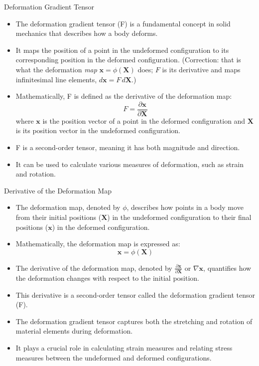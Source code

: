 \documentclass{beamer}
\begin{document}
\begin{frame}{Deformation Gradient Tensor}
    \begin{itemize}
        \item The deformation gradient tensor (F) is a fundamental concept in solid mechanics that describes how a body deforms.
        \item It maps the position of a point in the undeformed configuration to its corresponding position in the deformed configuration. (Correction: that is what the deformation \emph{map} $\mathbf{x}=\phi(\mathbf{X})$ does; $F$ is its derivative and maps infinitesimal line elements, $d\mathbf{x} = F\,d\mathbf{X}$.)
        \item Mathematically, F is defined as the derivative of the deformation map:
        \begin{equation*}
        F = \frac{\partial \mathbf{x}}{\partial \mathbf{X}}
        \end{equation*}
        where $\mathbf{x}$ is the position vector of a point in the deformed configuration and $\mathbf{X}$ is its position vector in the undeformed configuration.
        \item F is a second-order tensor, meaning it has both magnitude and direction.
        \item It can be used to calculate various measures of deformation, such as strain and rotation.
    \end{itemize}
\end{frame}

\begin{frame}{Derivative of the Deformation Map}
    \begin{itemize}
        \item The deformation map, denoted by $\phi$, describes how points in a body move from their initial positions ($\mathbf{X}$) in the undeformed configuration to their final positions ($\mathbf{x}$) in the deformed configuration.
        \item Mathematically, the deformation map is expressed as:
        \begin{equation*}
        \mathbf{x} = \phi(\mathbf{X})
        \end{equation*}
        \item The derivative of the deformation map, denoted by $\frac{\partial \mathbf{x}}{\partial \mathbf{X}}$ or $\nabla \mathbf{x}$, quantifies how the deformation changes with respect to the initial position.
        \item This derivative is a second-order tensor called the deformation gradient tensor (F).
        \item The deformation gradient tensor captures both the stretching and rotation of material elements during deformation.
        \item It plays a crucial role in calculating strain measures and relating stress measures between the undeformed and deformed configurations.
    \end{itemize}
\end{frame}
\end{document}
